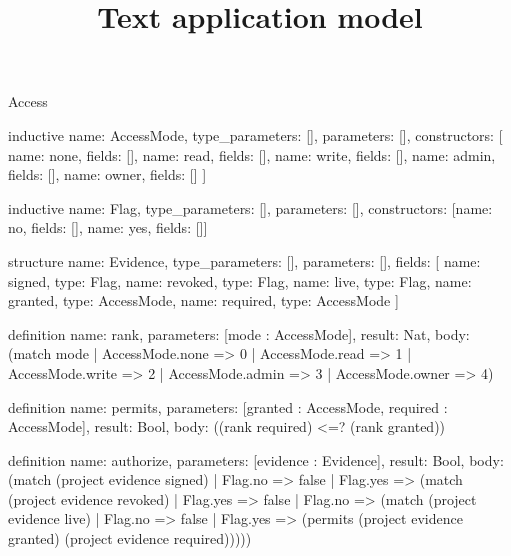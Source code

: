 \begin{lexlean}{Access}
\title{Text application model}
\begin{semanticmodule}
inductive{
  name: AccessMode,
  type_parameters: [],
  parameters: [],
  constructors: [
    {name: none, fields: []},
    {name: read, fields: []},
    {name: write, fields: []},
    {name: admin, fields: []},
    {name: owner, fields: []}
  ]
}

inductive{
  name: Flag,
  type_parameters: [],
  parameters: [],
  constructors: [{name: no, fields: []}, {name: yes, fields: []}]
}

structure{
  name: Evidence,
  type_parameters: [],
  parameters: [],
  fields: [
    {name: signed, type: Flag},
    {name: revoked, type: Flag},
    {name: live, type: Flag},
    {name: granted, type: AccessMode},
    {name: required, type: AccessMode}
  ]
}

definition{
  name: rank,
  parameters: [mode : AccessMode],
  result: Nat,
  body: (match mode
    | AccessMode.none => 0
    | AccessMode.read => 1
    | AccessMode.write => 2
    | AccessMode.admin => 3
    | AccessMode.owner => 4)
}

definition{
  name: permits,
  parameters: [granted : AccessMode, required : AccessMode],
  result: Bool,
  body: ((rank required) <=? (rank granted))
}

definition{
  name: authorize,
  parameters: [evidence : Evidence],
  result: Bool,
  body: (match (project evidence signed)
    | Flag.no => false
    | Flag.yes => (match (project evidence revoked)
      | Flag.yes => false
      | Flag.no => (match (project evidence live)
        | Flag.no => false
        | Flag.yes => (permits (project evidence granted) (project evidence required)))))
}
\end{semanticmodule}
\end{lexlean}
